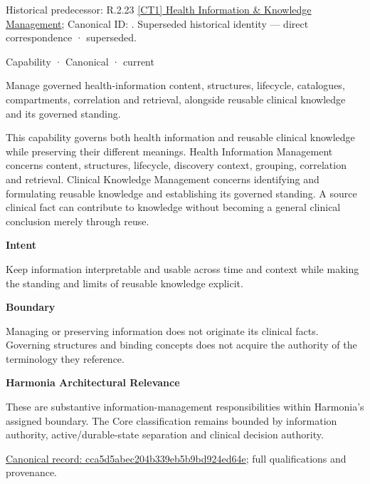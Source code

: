 {\small Historical predecessor: R.2.23 \hyperref[element:a1c557bd263047d0b3ff566cf50b98c1]{[CT1] Health Information \& Knowledge Management}; Canonical ID: \texttt{}. Superseded historical identity — direct correspondence · superseded.}\par
\label{element:cca5d5abec204b339eb5b9bd924ed64e}
{\small Capability · Canonical · current}\par

Manage governed health-information content, structures, lifecycle, catalogues, compartments, correlation and retrieval, alongside reusable clinical knowledge and its governed standing.



This capability governs both health information and reusable clinical knowledge while preserving their different meanings. Health Information Management concerns content, structures, lifecycle, discovery context, grouping, correlation and retrieval. Clinical Knowledge Management concerns identifying and formulating reusable knowledge and establishing its governed standing. A source clinical fact can contribute to knowledge without becoming a general clinical conclusion merely through reuse.



\textbf{Intent}



Keep information interpretable and usable across time and context while making the standing and limits of reusable knowledge explicit.



\textbf{Boundary}



Managing or preserving information does not originate its clinical facts. Governing structures and binding concepts does not acquire the authority of the terminology they reference.



\textbf{Harmonia Architectural Relevance}



These are substantive information-management responsibilities within Harmonia's assigned boundary. The Core classification remains bounded by information authority, active/durable-state separation and clinical decision authority.


{\footnotesize \href{../../../../../../../continuum/strategy/capability/cca5d5abec204b339eb5b9bd924ed64e.md}{Canonical record: cca5d5abec204b339eb5b9bd924ed64e}; full qualifications and provenance.}\par
